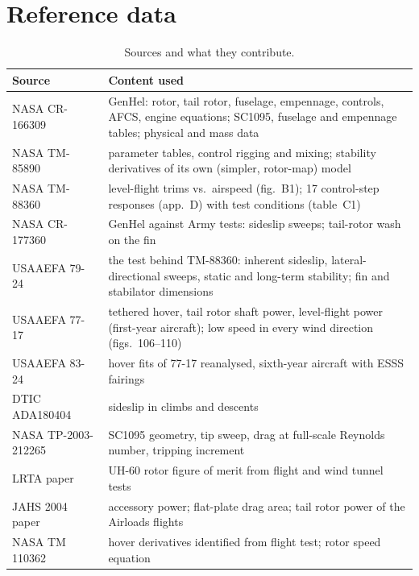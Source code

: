 \documentclass[10pt,a4paper,twocolumn]{article}
\begin{document}
\section{Reference data}\label{sec:ref}
\begin{table}[t]
\centering\small
\caption{Sources and what they contribute.}\label{tab:sources}
\begin{tabularx}{\columnwidth}{@{}>{\raggedright\arraybackslash}p{2.55cm}X@{}}
\toprule
Source & Content used \\
\midrule
NASA CR-166309~\cite{gh} & GenHel: rotor, tail rotor, fuselage, empennage, controls, AFCS, engine equations; SC1095, fuselage and empennage tables; physical and mass data \\
NASA TM-85890~\cite{hb} & parameter tables, control rigging and mixing; stability derivatives of its own (simpler, rotor-map) model \\
NASA TM-88360~\cite{bal} & level-flight trims vs.\ airspeed (fig.~B1); 17 control-step responses (app.~D) with test conditions (table~C1) \\
NASA CR-177360~\cite{kap} & GenHel against Army tests: sideslip sweeps; tail-rotor wash on the fin \\
USAAEFA 79-24~\cite{a7924} & the test behind TM-88360: inherent sideslip, lateral-directional sweeps, static and long-term stability; fin and stabilator dimensions \\
USAAEFA 77-17~\cite{a7717} & tethered hover, tail rotor shaft power, level-flight power (first-year aircraft); low speed in every wind direction (figs.~106--110) \\
USAAEFA 83-24~\cite{a8324} & hover fits of 77-17 reanalysed, sixth-year aircraft with ESSS fairings \\
DTIC ADA180404~\cite{a85} & sideslip in climbs and descents \\
NASA TP-2003-212265~\cite{bous} & SC1095 geometry, tip sweep, drag at full-scale Reynolds number, tripping increment \\
LRTA paper~\cite{lrta} & UH-60 rotor figure of merit from flight and wind tunnel tests \\
JAHS 2004 paper~\cite{perf} & accessory power; flat-plate drag area; tail rotor power of the Airloads flights \\
NASA TM 110362~\cite{flet} & hover derivatives identified from flight test; rotor speed equation \\

\end{tabularx}
\end{table}
\end{document}
